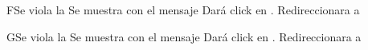 		\begin{UCtrayectoriaA}{F}{Se viola la   }
			\UCpaso[\UCsist] Se muestra     con el mensaje 
			\UCpaso[\UCactor] Dará click en  .
			\UCpaso[\UCsist] Redireccionara a    
		\end{UCtrayectoriaA}


		\begin{UCtrayectoriaA}{G}{Se viola la   }
			\UCpaso[\UCsist] Se muestra    con el mensaje 
			\UCpaso[\UCactor] Dará click en  .
			\UCpaso[\UCsist] Redireccionara a    
		\end{UCtrayectoriaA}










		
